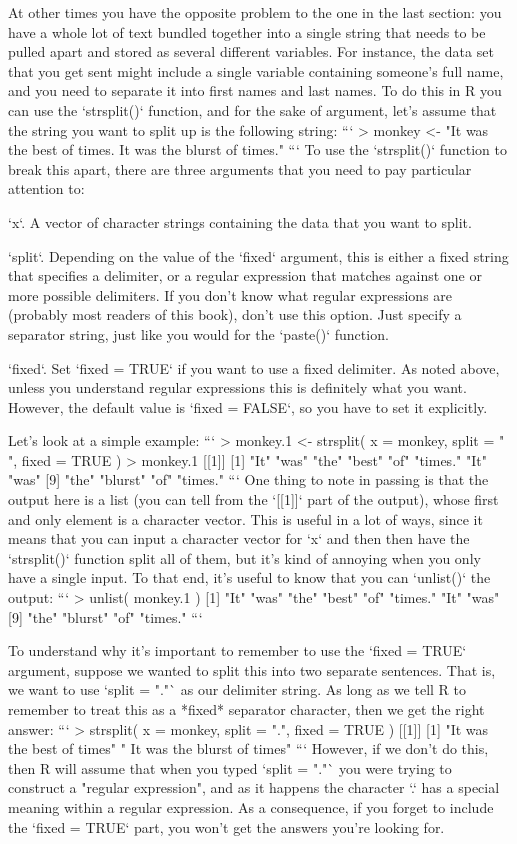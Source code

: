 At other times you have the opposite problem to the one in the last section: you have a whole lot of text bundled together into a single string that needs to be pulled apart and stored as several different variables. For instance, the data set that you get sent might include a single variable containing someone's full name, and you need to separate it into first names and last names. To do this in R you can use the `strsplit()` function, and for the sake of argument, let's assume that the string you want to split up is the following string:
```
> monkey <- "It was the best of times. It was the blurst of times."
```
To use the `strsplit()` function to break this apart, there are three arguments that you need to pay particular attention to:
 \itemsep 0pt
\item `x`. A vector of character strings containing the data that you want to split.
\item `split`. Depending on the value of the `fixed` argument, this is either a fixed string that specifies a delimiter, or a regular expression that matches against one or more possible delimiters. If you don't know what regular expressions are (probably most readers of this book), don't use this option. Just specify a separator string, just like you would for the `paste()` function.
\item `fixed`. Set `fixed = TRUE` if you want to use a fixed delimiter. As noted above, unless you understand regular expressions this is definitely what you want. However, the default value is `fixed = FALSE`, so you have to set it explicitly.

Let's look at a simple example:
```
> monkey.1 <- strsplit( x = monkey, split = " ", fixed = TRUE )
> monkey.1
[[1]]
 [1] "It"     "was"    "the"    "best"   "of"     "times." "It"     "was"   
 [9] "the"    "blurst" "of"     "times."
```
One thing to note in passing is that the output here is a list (you can tell from the `[[1]]` part of the output), whose first and only element is a character vector. This is useful in a lot of ways, since it means that you can input a character vector for `x` and then then have the `strsplit()` function split all of them, but it's kind of annoying when you only have a single input. To that end, it's useful to know that you can `unlist()` the output:
```
> unlist( monkey.1 )
 [1] "It"     "was"    "the"    "best"   "of"     "times." "It"     "was"   
 [9] "the"    "blurst" "of"     "times."
```

To understand why it's important to remember to use the `fixed = TRUE` argument, suppose we wanted to split this into two separate sentences. That is, we want to use `split = "."` as our delimiter string. As long as we tell R to remember to treat this as a *fixed* separator character, then we get the right answer:
```
> strsplit( x = monkey, split = ".", fixed = TRUE )
[[1]]
[1] "It was the best of times"    " It was the blurst of times"
```
However, if we don't do this, then R will assume that when you typed `split = "."` you were trying to construct a "regular expression", and as it happens the character `.` has a special meaning within a regular expression. As a consequence, if you forget to include the `fixed = TRUE` part, you won't get the answers you're looking for.



